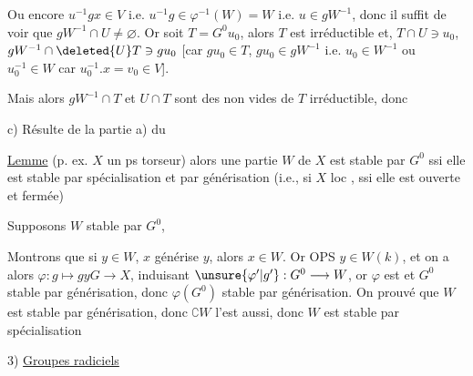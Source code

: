  Ou encore $u^{-1}gx\in V$ i.e. $u^{-1}g\in\varphi^{-1}(W)=W$ i.e.  $u\in gW^{-1}$, donc il suffit de voir que $gW^{-1}\cap U\ne\varnothing$. Or soit $T=G^0u_0$, alors  $T$ est irréductible et,  $T\cap U\ni u_0$, $gW^{-1}\cap\deleted{U}T\ni gu_0$ [car $gu_0\in T$, $gu_0\in gW^{-1}$ i.e. $u_0\in W^{-1}$ ou $u_0^{-1}\in W$ car $u_0^{-1}.x=v_0\in V$].

Mais alors $gW^{-1}\cap T$ et $U\cap T$ sont des  non vides de $T$ irréductible, donc  

c) Résulte de la partie a) du

\uline{Lemme}    (p. ex. $X$ un ps torseur) alors une partie $W$ de $X$ est stable par $G^0$ ssi elle est stable par spécialisation et par générisation (i.e., si $X$ loc , ssi elle est ouverte et fermée)

  Supposons $W$ stable par $G^0$,       

Montrons que si $y\in W$, $x$ générise $y$, alors $x\in W$. Or OPS $y\in W(k)$, et on a alors $\varphi:g\longmapsto gy$\quad $G\longrightarrow X$, induisant $\unsure{\varphi'|g'}:G^0\longrightarrow W$, or $\varphi$ est  et $G^0$ stable par générisation, donc $\varphi(G^0)$ stable par générisation. On  prouvé que $W$ est stable par générisation, donc $\complement W$ l'est aussi, donc $W$ est stable par spécialisation


3) \uline{Groupes  radiciels}

